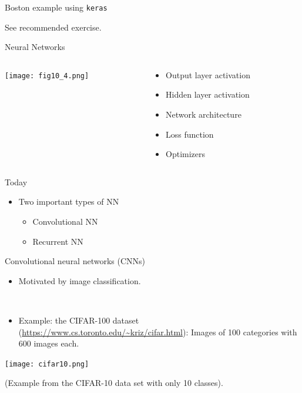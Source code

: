 \documentclass[
  10pt,
  ignorenonframetext,
  twocolumn]{beamer}
\providecommand{\tightlist}{%
  \setlength{\itemsep}{0pt}\setlength{\parskip}{0pt}}
\begin{document}
\begin{frame}[fragile]
\begin{block}{Boston example using \texttt{keras}}
\label{boston-example-using-keras}
\(~\)

See recommended exercise.
\end{block}
\end{frame}

\begin{frame}{Neural Networks}
\label{neural-networks}
\begin{columns}[T]
\begin{column}{0.5\textwidth}
\texttt{[image: fig10\_4.png]}
\end{column}

\begin{column}{0.6\textwidth}
\begin{itemize}
\tightlist
\item
  Output layer activation
\item
  Hidden layer activation
\item
  Network architecture
\item
  Loss function
\item
  Optimizers
\end{itemize}
\end{column}
\end{columns}
\end{frame}

\begin{frame}{Today}
\label{today}
\begin{itemize}
\item
  Two important types of NN

  \begin{itemize}
  \tightlist
  \item
    Convolutional NN
  \item
    Recurrent NN
  \end{itemize}
\end{itemize}
\end{frame}

\begin{frame}{Convolutional neural networks (CNNs)}
\label{convolutional-neural-networks-cnns}
\(~\)

\begin{itemize}
\tightlist
\item
  Motivated by image classification.
\end{itemize}

\(~\)

\begin{itemize}
\tightlist
\item
  Example: the CIFAR-100 dataset
  (\url{https://www.cs.toronto.edu/~kriz/cifar.html}): Images of 100
  categories with 600 images each.
\end{itemize}

\centering

\texttt{[image: cifar10.png]}

\flushleft
\scriptsize

(Example from the CIFAR-10 data set with only 10 classes).
\end{frame}
\end{document}
